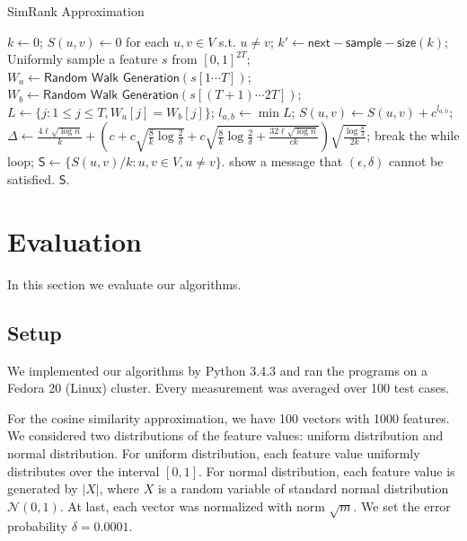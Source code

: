 \documentclass{article}
\begin{document}
\begin{algorithm}[!t]
\caption{\textsf{SimRank Approximation}}
\label{alg:sra}
\renewcommand{\algorithmicrequire}{\textbf{Input:}}
\renewcommand{\algorithmicensure}{\textbf{Output:}}
\begin{algorithmic}
\State $k \gets 0$;
\State $S(u,v) \gets 0$ for each $u, v \in V$ s.t. $u\not= v$;
	\State $k' \gets \mathsf{next-sample-size}(k)$;
		\State Uniformly sample a feature $s$ from $[0,1]^{2T}$;
			\State $W_a \gets \textsf{Random Walk Generation}(s[1\cdots T])$;
			\State $W_b \gets \textsf{Random Walk Generation}(s[(T+1)\cdots 2T])$;
			\State $L \gets \{j: 1\leq j\leq T, W_a[j] = W_b[j]\}$;
				\State $l_{a,b} \gets \min L$;
				\State $S(u,v) \gets S(u,v)+c^{l_{a,b}}$;
			\EndIf
		\EndFor
	\EndFor
	\State $\Delta \gets \frac{4\ell\sqrt{\log n}}{k} +\left(c+c\sqrt{\frac{8}{k}\log \frac{2}{\delta}} + c\sqrt{\frac{8}{k}\log \frac{2}{\delta} + \frac{32\ell\sqrt{\log n}}{ck}}\right)\sqrt{\frac{\log \frac{8}{\delta}}{2k}}$;
	\If {$\Delta \leq \epsilon$}
		\State break the while loop;
	\EndIf
\EndFor
\State $\mathsf{S} \gets \{S(u,v)/k : u,v\in V, u\not=v\}$.
	\State show a message that $(\epsilon,\delta)$ cannot be satisfied.
\EndIf
{} $\mathsf{S}$.
\end{algorithmic}
\end{algorithm}

\section{Evaluation}
\label{sec:eval}
In this section we evaluate our algorithms.

\subsection{Setup}
We implemented our algorithms by Python 3.4.3 and ran the programs on a Fedora 20 (Linux) cluster. Every measurement was averaged over 100 test cases.

For the cosine similarity approximation, we have 100 vectors with 1000 features. We considered two distributions of the feature values: uniform distribution and normal distribution. For uniform distribution, each feature value uniformly distributes over the interval $[0,1]$. For normal distribution, each feature value is generated by $|X|$, where $X$ is a random variable of standard normal distribution $\mathcal{N}(0,1)$. At last, each vector was normalized with norm $\sqrt{m}$. We set the error probability $\delta = 0.0001$.
\end{document}

